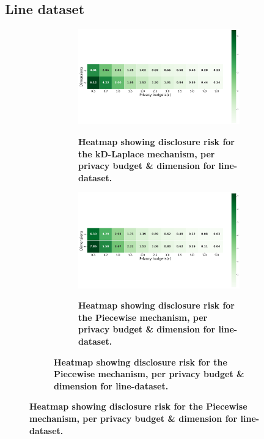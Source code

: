 \subsection{Line dataset} \label{appendix:results-privacy-line-dataset}
\begin{figure}
    \centering
    \begin{subfigure}[b]{0.85\textwidth}
        \begin{subfigure}[c]{1\textwidth}
            \caption{\textbf{Heatmap showing disclosure risk for the kD-Laplace mechanism, per privacy budget \& dimension for line-dataset.}}
            \includegraphics[width=1\textwidth]{Results/kd-laplace/kd-Laplace/line-dataset/distance.png}
            \label{fig:privacy-risk_line-dataset_adversial_advantage_kd-laplace}
        \end{subfigure}
        \vfill %

        \begin{subfigure}[c]{1\textwidth}
            \caption{\textbf{Heatmap showing disclosure risk for the Piecewise mechanism, per privacy budget \& dimension for line-dataset.}}
            \includegraphics[width=1\textwidth]{Results/kd-laplace/piecewise/line-dataset/distance.png}
            \label{fig:privacy-risk_line-dataset_adversial_advantage_piecewise}
        \end{subfigure}
    \end{subfigure}
\end{figure}
\newpage
